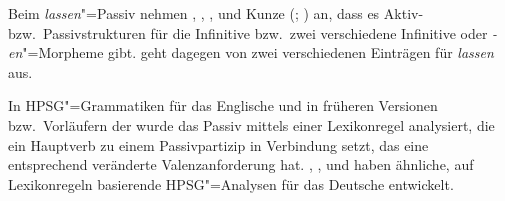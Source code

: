 {{%

Beim \emph{lassen}"=Passiv nehmen \citet[]{Reis76c}, \citet{Wilder90a},
\citet[--149]{Fanselow87a}, %
\citet[]{Demske94a} und 
Kunze (\citeyear[]{Kunze96}; \citeyear[]{Kunze97a}) %
an, dass es Aktiv- bzw.\ Passivstrukturen für die Infinitive
bzw.\ zwei verschiedene Infinitive oder \emph{-en}"=Morpheme gibt.
\citet[]{Hoehle78a} geht dagegen von zwei verschiedenen Einträgen für \emph{lassen} aus.

In HPSG"=Grammatiken für das Englische \citep[--218]{ps}
und in früheren Versionen bzw.\ Vorläufern der \lfg \citep{Bresnan78a,Bresnan82a} wurde das Passiv mittels einer Lexikonregel
analysiert, die ein Hauptverb zu einem Passivpartizip in Verbindung setzt, das eine entsprechend
veränderte Valenzanforderung hat.
\citet[]{Kiss92}, 
\citet{HN98a},
\citet[]{Kathol98b} und
\citet{Mueller2000h}
haben ähnliche, auf Lexikonregeln basierende HPSG"=Analysen für das Deutsche entwickelt.
}



\begin{comment}

liefen die Jungen von unserer Straße auf tiefer gelegenen Tümpeln in den Feldern Schlittschuh, 
wenn diese vollgeregnet waren\footnote{
  taz, 19.03.1999, LeserInnenbriefe, S.\,7.
}

Aus einem ihrer Fenster im dritten Stock haben die Mitglieder des Neuen Forums,
der Vereinigten Linken, der Umweltbibliothek und die "`mündigen Bürger"' ein Transparent herausgehängt.
Vollgeregnet fordert es die "`Zerschlagung der Stasi-Struktur -- Gegen neue Geheimdienste -- 
Keinen Polizeistaat"'.\footnote{
  taz, 12.09.1990, S.\,5.
}
Seine Landschaften sind weder klare Sehnsuchts-bilder romantischer Ferne noch kultivierte er die sentimentalen Ecken des Spaziergängers. Seine Natur ist windzerzaust, naßgeregnet, aufgewühlt.
12.4.1991 Lavie 96 Zeilen, katrin bettina müller S. 4

die armen Radfahrer, strampeln ohne jede Motorkraft ungeschützt gegen Wind und Wetter, naßgeschwitzt und naßgeregnet.
21.10.1988 taz 337 Zeilen, bernd müllender S. 11

Sie werden erst eingeschneit, dann langsam eingeregnet, 
21.2.1992 taz 248 Zeilen, elke schmitter S. 16
In taz-Berlin S.18 / Europaverlag


\end{comment}}
